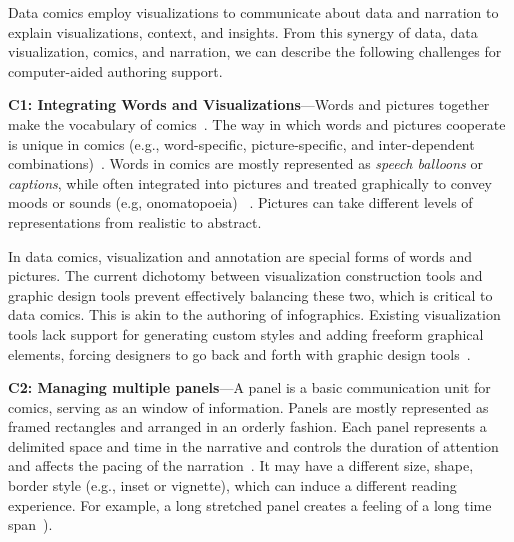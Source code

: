 Data comics employ visualizations to communicate about data and narration to explain visualizations, context, and insights. From this synergy of data, data visualization, comics, and narration, we can describe the following challenges for computer-aided authoring support.

\textbf{C1: Integrating Words and Visualizations}---Words and pictures together make the vocabulary of comics~\cite{mccloud1993understanding}. The way in which words and pictures cooperate is unique in comics (e.g., word-specific, picture-specific, and inter-dependent combinations)~\cite{saraceni2003language,mccloud1993understanding}. Words in comics are mostly represented as \textit{speech balloons} or \textit{captions}, while often integrated into pictures and treated graphically to convey moods or sounds (e.g, onomatopoeia) ~\cite{eisner2008comics}. Pictures can take different levels of representations from realistic to abstract. 

In data comics, visualization and annotation are special forms of words and pictures. The current dichotomy between visualization construction tools and graphic design tools prevent effectively balancing these two, which is critical to data comics. This is akin to the authoring of infographics. Existing visualization tools lack support for generating custom styles and adding freeform graphical elements, forcing designers to go back and forth with graphic design tools~\cite{bigelow2017iterating}.




\textbf{C2: Managing multiple panels}---A panel is a basic communication unit for comics, serving as an window of information. Panels are mostly represented as framed rectangles and arranged in an orderly fashion. Each panel represents a delimited space and time in the narrative and controls the duration of attention and affects the pacing of the narration~\cite{caldwell2012comic,duncan2000toward,duncan2015power}. It may have a different size, shape, border style (e.g., inset or vignette), which can induce a different reading experience. For example, a long stretched panel creates a feeling of a long time span~\cite{eisner2008comics}).

